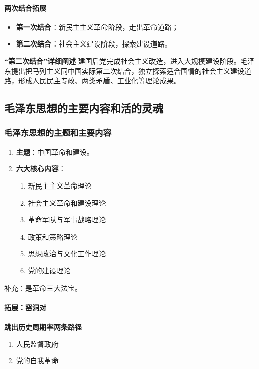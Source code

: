 \paragraph{两次结合拓展}
\begin{itemize}
    \item \textbf{第一次结合}：新民主主义革命阶段，走出革命道路；
    \item \textbf{第二次结合}：社会主义建设阶段，探索建设道路。
\end{itemize}
\vspace{0.3em}
\textbf{“第二次结合”详细阐述}
建国后党完成社会主义改造，进入大规模建设阶段。毛泽东提出把马列主义同中国实际第二次结合，独立探索适合国情的社会主义建设道路，形成人民民主专政、两类矛盾、工业化等理论成果。

\subsection{毛泽东思想的主要内容和活的灵魂}
\subsubsection{毛泽东思想的主题和主要内容}
\begin{enumerate}
    \item \textbf{主题}：中国革命和建设。
    \item \textbf{六大核心内容}：
    \begin{enumerate}
        \item 新民主主义革命理论
        \item 社会主义革命和建设理论
        \item 革命军队与军事战略理论
        \item 政策和策略理论
        \item 思想政治与文化工作理论
        \item 党的建设理论
    \end{enumerate}
\end{enumerate}
\vspace{0.3em}
补充：是革命三大法宝。

\paragraph{拓展：窑洞对}
\textbf{跳出历史周期率两条路径}
\begin{enumerate}
    \item 人民监督政府
    \item 党的自我革命
\end{enumerate}

